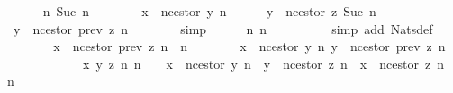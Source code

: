 \begin{isabellebody}
\ \ \ \ \isamarkupfalse%
\ {\isachardoublequoteopen}{\isacharbraceleft}n{}{\isacharcomma}\ Suc\ n{}{\isacharbraceright}\ {\isasymsubseteq}\ {\isasymnat}{\isachardoublequoteclose}\isanewline
\ \ \ \ \isamarkupfalse%
\ {\isachardoublequoteopen}x\ {\isacharequal}\ n{\isacharunderscore}cestor\ {\isacharparenleft}y{\isacharcomma}\ n{}{\isacharparenright}{\isachardoublequoteclose}\isanewline
\ \ \ \ \isamarkupfalse%
\ {\isachardoublequoteopen}y\ {\isacharequal}\ n{\isacharunderscore}cestor\ {\isacharparenleft}z{\isacharcomma}\ Suc\ n{}{\isacharparenright}{\isachardoublequoteclose}\isanewline
\ \ \ \ \isamarkupfalse%
\ \isamarkupfalse%
\ {\isachardoublequoteopen}y\ {\isacharequal}\ n{\isacharunderscore}cestor\ {\isacharparenleft}prev\ z{\isacharcomma}\ n{}{\isacharparenright}{\isachardoublequoteclose}\isanewline
\ \ \ \ \ \ \isamarkupfalse%
\ simp\isanewline
\ \ \ \ \isamarkupfalse%
\ {\isachardoublequoteopen}{\isacharbraceleft}n{}{\isacharcomma}\ n{}{\isacharbraceright}\ {\isasymsubseteq}\ {\isasymnat}{\isachardoublequoteclose}\isanewline
\ \ \ \ \ \ \isamarkupfalse%
\ {\isacharparenleft}simp\ add{\isacharcolon}\ Nats{\isacharunderscore}def{\isacharparenright}\isanewline
\ \ \ \ \isamarkupfalse%
\ \isamarkupfalse%
\ {\isachardoublequoteopen}x\ {\isacharequal}\ n{\isacharunderscore}cestor\ {\isacharparenleft}prev\ z{\isacharcomma}\ n{}\ {\isacharplus}\ n{}{\isacharparenright}{\isachardoublequoteclose}\isanewline
\ \ \ \ \ \ \isamarkupfalse%
\ {\isacartoucheopen}x\ {\isacharequal}\ n{\isacharunderscore}cestor\ {\isacharparenleft}y{\isacharcomma}\ n{}{\isacharparenright}{\isacartoucheclose}\ {\isacartoucheopen}y\ {\isacharequal}\ n{\isacharunderscore}cestor\ {\isacharparenleft}prev\ z{\isacharcomma}\ n{}{\isacharparenright}{\isacartoucheclose}\isanewline
\ \ \ \ \ \ \ \ \ \ \ \ {\isacartoucheopen}{\isasymforall}x\ y\ z{\isachardot}\ {\isacharbraceleft}n{}{\isacharcomma}\ n{}{\isacharbraceright}\ {\isasymsubseteq}\ {\isasymnat}\ {\isasymlongrightarrow}\ x\ {\isacharequal}\ n{\isacharunderscore}cestor\ {\isacharparenleft}y{\isacharcomma}\ n{}{\isacharparenright}\ {\isasymlongrightarrow}\ y\ {\isacharequal}\ n{\isacharunderscore}cestor\ {\isacharparenleft}z{\isacharcomma}\ n{}{\isacharparenright}\ {\isasymlongrightarrow}\ x\ {\isacharequal}\ n{\isacharunderscore}cestor\ {\isacharparenleft}z{\isacharcomma}\ n{}\ {\isacharplus}\ n{}{\isacharparenright}{\isacartoucheclose}\isanewline

\end{isabellebody}
